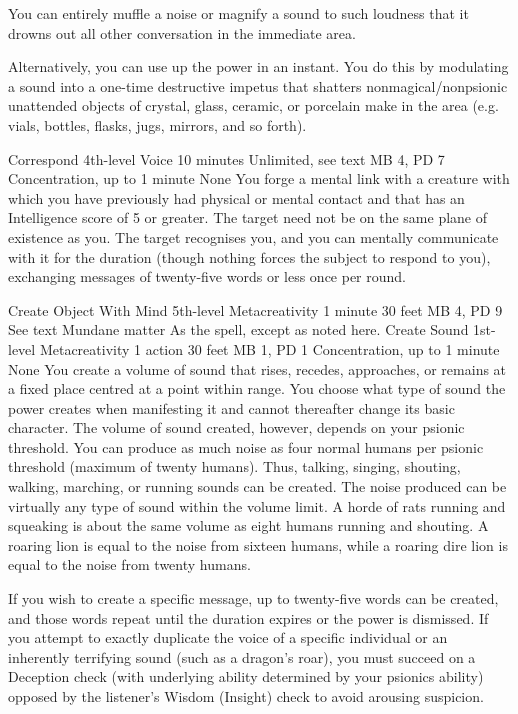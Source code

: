 You can entirely muffle a noise or magnify a sound to such
loudness that it drowns out all other conversation in the
immediate area.

Alternatively, you can use up the power in an instant. You
do this by modulating a sound into a one-time destructive
impetus that shatters nonmagical/nonpsionic unattended objects
of crystal, glass, ceramic, or porcelain make in the area
(e.g. vials, bottles, flasks, jugs, mirrors, and so forth).

\DndPowerHeader%
    {Correspond\label{pwr:correspond}}
    {4th-level Voice}
    {10 minutes}
    {Unlimited, see text}
    {MB 4, PD 7}
    {Concentration, up to 1 minute}
    {None}
You forge a mental link with a creature with
which you have previously had physical or mental contact and
that has an Intelligence score of 5 or greater.
The target need not be on the same plane of existence as you.
The target recognises you, and you can mentally
communicate with it for
the duration (though nothing forces the subject to respond
to you), exchanging messages of twenty-five words or less
once per round.

\DndPowerHeader%
    {Create Object With Mind\label{pwr:create_object_with_mind}}
    {5th-level Metacreativity}
    {1 minute}
    {30 feet}
    {MB 4, PD 9}
    {See text}
    {Mundane matter}
As the  spell, except as
noted here.
\DndPowerHeader%
    {Create Sound\label{pwr:create_sound}}
    {1st-level Metacreativity}
    {1 action}
    {30 feet}
    {MB 1, PD 1}
    {Concentration, up to 1 minute}
    {None}
You create a volume of sound that rises,
recedes, approaches, or remains at a fixed place centred at
a point within range. You choose what type of sound the power
creates when manifesting it and cannot thereafter change its
basic character. The volume of sound created, however, depends
on your psionic threshold. You can produce as much noise as
four normal humans per psionic threshold (maximum of twenty humans).
Thus, talking, singing, shouting, walking, marching, or running
sounds can be created. The noise produced can be virtually
any type of sound within the volume limit. A horde of rats
running and squeaking is about the same volume as eight humans
running and shouting. A roaring lion is equal to the noise
from sixteen humans, while a roaring dire lion is equal to
the noise from twenty humans.

If you wish to create a specific message, up to twenty-five
words can be created, and those words repeat
until the duration expires or the power is dismissed. If you
attempt to exactly duplicate the voice of a specific individual
or an inherently terrifying sound (such as a dragon's roar),
you must succeed on a Deception check
(with underlying ability determined by your psionics ability)
opposed by the listener's
Wisdom (Insight) check to avoid arousing suspicion.


